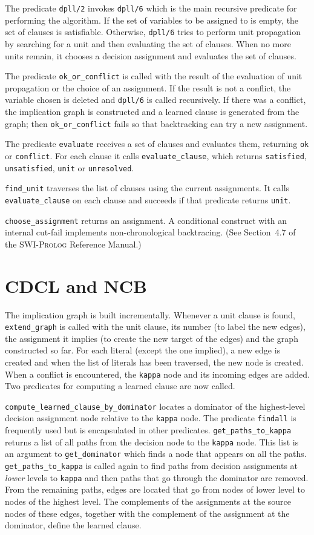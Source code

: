 \documentclass[11pt]{article}
\newcommand*{\p}[1]{\textup{\texttt{#1}}}
\newcommand*{\sw}{\textsc{SWI-Prolog}}
\begin{document}
The predicate \p{dpll/2} invokes \p{dpll/6} which is the main recursive
predicate for performing the algorithm. If the set of variables to be
assigned to is empty, the set of clauses is satisfiable. Otherwise,
\p{dpll/6} tries to perform unit propagation by searching for a unit and
then evaluating the set of clauses. When no more units remain, it
chooses a decision assignment and evaluates the set of clauses.

The predicate \p{ok\_or\_conflict} is called with the result of the
evaluation of unit propagation or the choice of an assignment. If the
result is not a conflict, the variable chosen is deleted and \p{dpll/6}
is called recursively. If there was a conflict, the implication graph is
constructed and a learned clause is generated from the graph; then
\p{ok\_or\_conflict} fails so that backtracking can try a new
assignment.

The predicate \p{evaluate} receives a set of clauses and evaluates them,
returning \p{ok} or \p{conflict}. For each clause it calls
\p{evaluate\_clause}, which returns \p{satisfied}, \p{unsatisfied},
\p{unit} or \p{unresolved}.

\p{find\_unit} traverses the list of clauses using the current
assignments. It calls \p{evaluate\_clause} on each clause and succeeds
if that predicate returns \p{unit}.

\p{choose\_assignment} returns an assignment. A conditional construct
with an internal cut-fail implements non-chronological backtracing. (See
Section~4.7 of the \sw{} Reference Manual.)


\section{CDCL and NCB}

The implication graph is built incrementally. Whenever a unit clause is
found, \p{extend\_graph} is called with the unit clause, its number (to
label the new edges), the assignment it implies (to create the new
target of the edges) and the graph constructed so far. For each literal
(except the one implied), a new edge is created and when the list of
literals has been traversed, the new node is created. When a conflict is
encountered, the \p{kappa} node and its incoming edges are added.
Two predicates for computing a learned clause are now called.

\p{compute\_learned\_clause\_by\_dominator} locates a dominator of the
highest-level decision assignment node relative to the \p{kappa} node.
The predicate \p{findall} is frequently used but is encapsulated in
other predicates. \p{get\_paths\_to\_kappa} returns a list of all paths
from the decision node to the \p{kappa} node. This list is an argument
to \p{get\_dominator} which finds a node that appears on all the paths.
\p{get\_paths\_to\_kappa} is called again to find paths from decision
assignments at \textit{lower} levels to \p{kappa} and then paths that go
through the dominator are removed. From the remaining paths, edges are
located that go from nodes of lower level to nodes of the highest level.
The complements of the assignments at the source nodes of these edges,
together with the complement of the assignment at the dominator, define
the learned clause.
\end{document}
